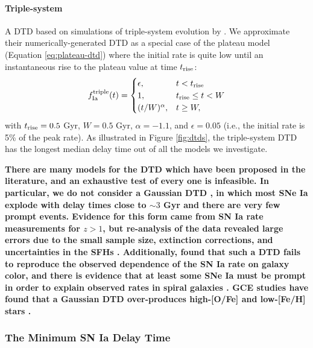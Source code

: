 \documentclass[twocolumn,twocolappendix,linenumbers]{aastex631}
\begin{document}
\paragraph{Triple-system} A DTD based on simulations of triple-system evolution by \citet{Rajamuthukumar2023-TripleEvolution}. We approximate their numerically-generated DTD as a special case of the plateau model (Equation \ref{eq:plateau-dtd}) where the initial rate is quite low until an instantaneous rise to the plateau value at time $t_{\rm rise}$:
\begin{equation}
    f_{\rm Ia}^{\rm triple}(t) =
    \begin{cases}
        \epsilon, & t < t_{\rm rise} \\
        1, & t_{\rm rise} \leq t < W \\
        (t / W) ^ \alpha, & t \geq W,
    \end{cases}
    \label{eq:triple-dtd}
\end{equation}
with $t_{\rm rise}=0.5$ Gyr, $W=0.5$ Gyr, $\alpha=-1.1$, and $\epsilon=0.05$ (i.e., the initial rate is 5\% of the peak rate). As illustrated in Figure \ref{fig:dtds}, the triple-system DTD has the longest median delay time out of all the models we investigate.

{\bf There are many models for the DTD which have been proposed in the literature, and an exhaustive test of every one is infeasible. In particular, we do not consider a Gaussian DTD \citep[e.g.,][]{Strolger2004-SNIaProgenitors}, in which most SNe Ia explode with delay times close to $\sim 3$ Gyr and there are very few prompt events. Evidence for this form came from SN Ia rate measurements for $z>1$, but re-analysis of the data revealed large errors due to the small sample size, extinction corrections, and uncertainties in the SFHs \citep[e.g.,][]{Forster2006-SNIaConstraints,Greggio2008-CosmicMix}. Additionally, \citet{Mannucci2006-TwoPopulations} found that such a DTD fails to reproduce the observed dependence of the SN Ia rate on galaxy color, and there is evidence that at least some SNe Ia must be prompt in order to explain observed rates in spiral galaxies \citep[e.g.,][]{Mannucci2005-SNRate,ScannapiecoBildsten2005-SNIaRate}. GCE studies have found that a Gaussian DTD over-produces high-[O/Fe] and low-[Fe/H] stars \citep{Matteucci2009-DTDModels,Palicio2023-AnalyticDTD}.}

\subsubsection{The Minimum SN Ia Delay Time}
\label{sec:minimum-delay}
\end{document}
